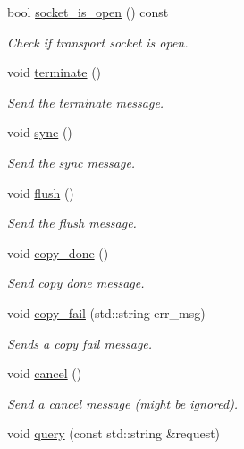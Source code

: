 \begin{DoxyCompactItemize}
bool \hyperlink{classsession_af9ad7820dfc4dddfeaae34d338cd4fca}{socket\+\_\+is\+\_\+open} () const
\begin{DoxyCompactList}\small\item\em Check if transport socket is open. \end{DoxyCompactList}\item 
void \hyperlink{classsession_afb9f415bc0005e8ba4dbb88c15983bf2}{terminate} ()
\begin{DoxyCompactList}\small\item\em Send the terminate message. \end{DoxyCompactList}\item 
void \hyperlink{classsession_a7110489d3bbf811651e1462b7c63ba6f}{sync} ()
\begin{DoxyCompactList}\small\item\em Send the sync message. \end{DoxyCompactList}\item 
void \hyperlink{classsession_a4b07d4a40633e6e63ff784a0af69210c}{flush} ()
\begin{DoxyCompactList}\small\item\em Send the flush message. \end{DoxyCompactList}\item 
void \hyperlink{classsession_a93ca7183c84d3f7734b0dac2794a8e9d}{copy\+\_\+done} ()
\begin{DoxyCompactList}\small\item\em Send copy done message. \end{DoxyCompactList}\item 
void \hyperlink{classsession_a41025799ee51c579959d7ef7ea3095d4}{copy\+\_\+fail} (std\+::string err\+\_\+msg)
\begin{DoxyCompactList}\small\item\em Sends a copy fail message. \end{DoxyCompactList}\item 
\mbox{\label{classsession_a7f08ec83852352c8e5a3d3b0392160e7}} 
void \hyperlink{classsession_a7f08ec83852352c8e5a3d3b0392160e7}{cancel} ()
\begin{DoxyCompactList}\small\item\em Send a cancel message (might be ignored). \end{DoxyCompactList}\item 
void \hyperlink{classsession_a30a6b529e3bd3de3d2ffdc12c162db06}{query} (const std\+::string \&request)

\end{DoxyCompactItemize}
